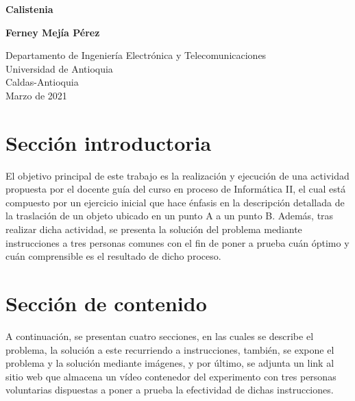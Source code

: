 \documentclass{article}
\begin{document}
\begin{titlepage}
    \begin{center}
        \vspace*{1cm}
            
        \Huge
        \textbf{Calistenia}
            
        \vspace{0.5cm}
        \LARGE
            
            
        \vspace{1.5cm}
            
        \textbf{Ferney Mejía Pérez}
            
        \vfill
            
        \vspace{0.8cm}
            
        \Large
        Departamento de Ingeniería Electrónica y Telecomunicaciones\\
        Universidad de Antioquia\\
        Caldas-Antioquia\\
        Marzo de 2021
            
    \end{center}
\end{titlepage}

\tableofcontents
\newpage
\section{Sección introductoria}\label{intro}
El objetivo principal de este trabajo es la realización y ejecución de una actividad propuesta por el docente guía del curso en proceso de Informática II, el cual está compuesto por un ejercicio inicial que hace énfasis en la descripción detallada de la traslación de un objeto ubicado en un punto A a un punto B. Además, tras realizar dicha actividad, se presenta la solución del problema mediante instrucciones a tres personas comunes con el fin de poner a prueba cuán óptimo y cuán comprensible es el resultado de dicho proceso.


\section{Sección de contenido} \label{contenido}
A continuación, se presentan cuatro secciones, en las cuales se describe el problema, la solución a este recurriendo a instrucciones, también, se expone el problema y la solución mediante imágenes, y por último, se adjunta un link al sitio web que almacena un vídeo contenedor del experimento con tres personas voluntarias dispuestas a poner a prueba la efectividad de dichas instrucciones.
\end{document}
